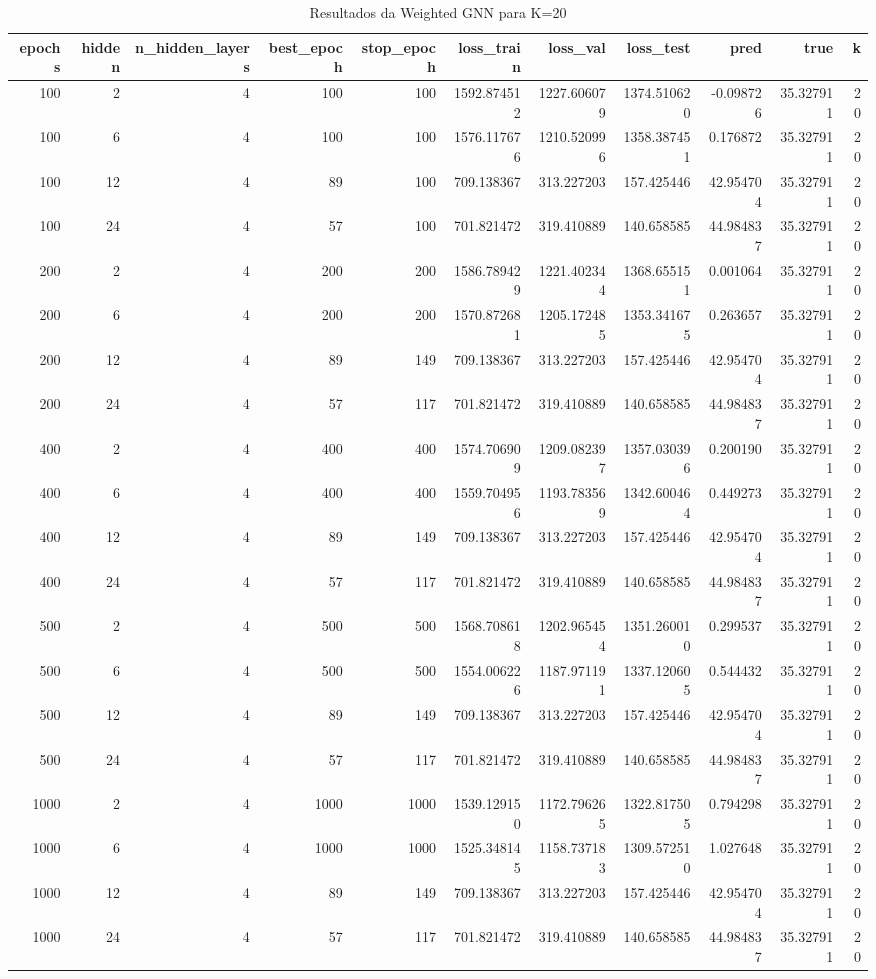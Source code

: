 \begin{table}
\caption{Resultados da Weighted GNN para K=20}
\label{tab:weighted_gnn_results_k20}
\begin{tabular}{rrrrrrrrrrr}
\toprule
epochs & hidden & n\_hidden\_layers & best\_epoch & stop\_epoch & loss\_train & loss\_val & loss\_test & pred & true & k \\
\midrule
100 & 2 & 4 & 100 & 100 & 1592.874512 & 1227.606079 & 1374.510620 & -0.098726 & 35.327911 & 20 \\
100 & 6 & 4 & 100 & 100 & 1576.117676 & 1210.520996 & 1358.387451 & 0.176872 & 35.327911 & 20 \\
100 & 12 & 4 & 89 & 100 & 709.138367 & 313.227203 & 157.425446 & 42.954704 & 35.327911 & 20 \\
100 & 24 & 4 & 57 & 100 & 701.821472 & 319.410889 & 140.658585 & 44.984837 & 35.327911 & 20 \\
200 & 2 & 4 & 200 & 200 & 1586.789429 & 1221.402344 & 1368.655151 & 0.001064 & 35.327911 & 20 \\
200 & 6 & 4 & 200 & 200 & 1570.872681 & 1205.172485 & 1353.341675 & 0.263657 & 35.327911 & 20 \\
200 & 12 & 4 & 89 & 149 & 709.138367 & 313.227203 & 157.425446 & 42.954704 & 35.327911 & 20 \\
200 & 24 & 4 & 57 & 117 & 701.821472 & 319.410889 & 140.658585 & 44.984837 & 35.327911 & 20 \\
400 & 2 & 4 & 400 & 400 & 1574.706909 & 1209.082397 & 1357.030396 & 0.200190 & 35.327911 & 20 \\
400 & 6 & 4 & 400 & 400 & 1559.704956 & 1193.783569 & 1342.600464 & 0.449273 & 35.327911 & 20 \\
400 & 12 & 4 & 89 & 149 & 709.138367 & 313.227203 & 157.425446 & 42.954704 & 35.327911 & 20 \\
400 & 24 & 4 & 57 & 117 & 701.821472 & 319.410889 & 140.658585 & 44.984837 & 35.327911 & 20 \\
500 & 2 & 4 & 500 & 500 & 1568.708618 & 1202.965454 & 1351.260010 & 0.299537 & 35.327911 & 20 \\
500 & 6 & 4 & 500 & 500 & 1554.006226 & 1187.971191 & 1337.120605 & 0.544432 & 35.327911 & 20 \\
500 & 12 & 4 & 89 & 149 & 709.138367 & 313.227203 & 157.425446 & 42.954704 & 35.327911 & 20 \\
500 & 24 & 4 & 57 & 117 & 701.821472 & 319.410889 & 140.658585 & 44.984837 & 35.327911 & 20 \\
1000 & 2 & 4 & 1000 & 1000 & 1539.129150 & 1172.796265 & 1322.817505 & 0.794298 & 35.327911 & 20 \\
1000 & 6 & 4 & 1000 & 1000 & 1525.348145 & 1158.737183 & 1309.572510 & 1.027648 & 35.327911 & 20 \\
1000 & 12 & 4 & 89 & 149 & 709.138367 & 313.227203 & 157.425446 & 42.954704 & 35.327911 & 20 \\
1000 & 24 & 4 & 57 & 117 & 701.821472 & 319.410889 & 140.658585 & 44.984837 & 35.327911 & 20 \\
\bottomrule
\end{tabular}
\end{table}
